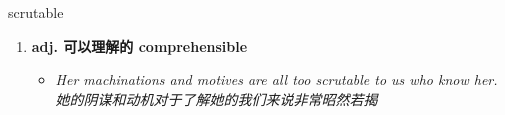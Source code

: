 
\begin{frame}
{\huge scrutable}
\begin{center}
\begin{enumerate}\Large
  \item \textbf{adj. 可以理解的 comprehensible}
  \begin{itemize}
    \item \em{\Large{Her machinations and motives are all too scrutable to us who know her. 她的阴谋和动机对于了解她的我们来说非常昭然若揭}}
  \end{itemize}
\end{enumerate}
\end{center}
\end{frame}

